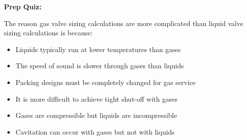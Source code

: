 \vfil \eject

\noindent
{\bf Prep Quiz:}

The reason gas valve sizing calculations are more complicated than liquid valve sizing calculations is because:

\begin{itemize}
\item{} Liquids typically run at lower temperatures than gases
\vskip 5pt
\item{} The speed of sound is slower through gases than liquids
\vskip 5pt
\item{} Packing designs must be completely changed for gas service
\vskip 5pt
\item{} It is more difficult to achieve tight shut-off with gases
\vskip 5pt
\item{} Gases are compressible but liquids are incompressible
\vskip 5pt
\item{} Cavitation can occur with gases but not with liquids
\end{itemize}




